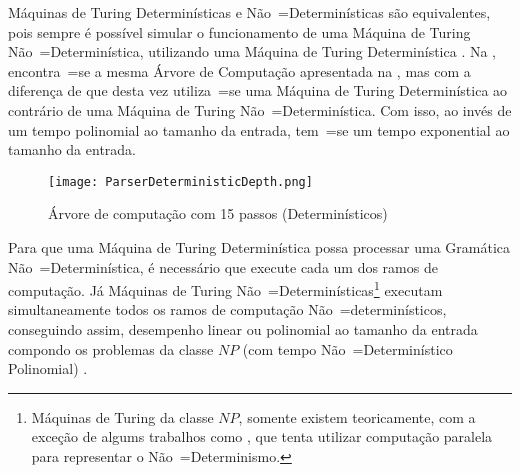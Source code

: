Máquinas de Turing Determinísticas e
Não~=Determinísticas são equivalentes,
pois sempre é possível simular o funcionamento de uma Máquina de Turing Não~=Determinística,
utilizando uma Máquina de Turing Determinística \cite{hopcroftBook}.
Na ,
encontra~=se a mesma Árvore de Computação apresentada na ,
mas com a diferença de que desta vez utiliza~=se uma Máquina de Turing Determinística ao contrário de uma Máquina de Turing Não~=Determinística.
Com isso,
ao invés de um tempo polinomial ao tamanho da entrada,
tem~=se um tempo exponential ao tamanho da entrada.
\begin{figure}[!htb]
\caption{Árvore de computação com 15 passos (Determinísticos)}
\label{ParserDeterministic}
\centering
\texttt{[image: ParserDeterministicDepth.png]}
\end{figure}

Para que uma Máquina de Turing Determinística possa processar uma Gramática Não~=Determinística,
é necessário que execute cada um dos ramos de computação.
Já Máquinas de Turing Não~=Determinísticas\footnote{
Máquinas de Turing da classe $NP$,
somente existem teoricamente,
com a exceção de algums trabalhos como ,
que tenta utilizar computação paralela para representar o Não~=Determinismo.
}
executam simultaneamente todos os ramos de computação Não~=determinísticos,
conseguindo assim, desempenho linear ou
polinomial ao tamanho da entrada compondo os problemas da classe $NP$ (com tempo Não~=Determinístico Polinomial) \cite{hopcroftBook}.


